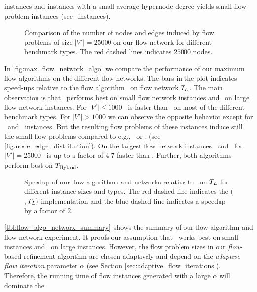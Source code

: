 instances and instances with a small average hypernode degree yields small flow problem
instances (see \Dual~instances).\\
\begin{figure}[ht!]
\centering
\caption{Comparison of the number of nodes and edges induced by flow problems 
         of size $|V'| = 25000$ on our flow network for different benchmark types.
         The red dashed lines indicates $25000$ nodes.}
\label{fig:node_edge_distribution}
\end{figure} 
In \autoref{fig:max_flow_network_algo} we compare the performance of our maximum flow algorithms on the
different flow networks. The bars in the plot indicates speed-ups relative to the flow algorithm
\EdmondKarp~on flow network $T_L$. The main observation is that \EdmondKarp~performs
best on small flow network instances and \GoldbergTarjan~on large flow network instances. For $|V'| \le 1000$
\EdmondKarp~is faster than \GoldbergTarjan~on most of the different benchmark types. For
$|V'| > 1000$ we can observe the opposite behavior except for \DAC~and \Dual~instances. But the
resulting flow problems of these instances induce still the small flow problems compared to e.g.,
\Primal~or \Literal. (see \autoref{fig:node_edge_distribution}). 
On the largest flow network instances \Primal~and \Literal~for $|V'| = 25000$ 
\GoldbergTarjan~is up to a factor of $4$-$7$ faster than \EdmondKarp.
Further, both algorithms perform best on $T_{\text{Hybrid}}$.\\
\begin{figure}
\centering
\caption{Speedup of our flow algorithms and networks relative to \EdmondKarp~on
         $T_L$ for different instance sizes and types. The red dashed line indicates the
         $($\EdmondKarp$,T_L)$ implementation and the blue dashed line
         indicates a speedup by a factor of $2$.}
\label{fig:max_flow_network_algo}
\end{figure} 
\autoref{tbl:flow_algo_network_summary}~shows the summary of our flow algorithm and flow network experiment. 
It proofs our assumption that \EdmondKarp~works best on small instances
and \GoldbergTarjan~on large instances. However, the flow problem sizes in our
\emph{flow}-based refinement algorithm are chosen adaptively and depend on the
\emph{adaptive flow iteration} parameter $\alpha$ (see Section \ref{sec:adaptive_flow_iterations}).
Therefore, the running time of flow instances generated with a large $\alpha$ will dominate the
